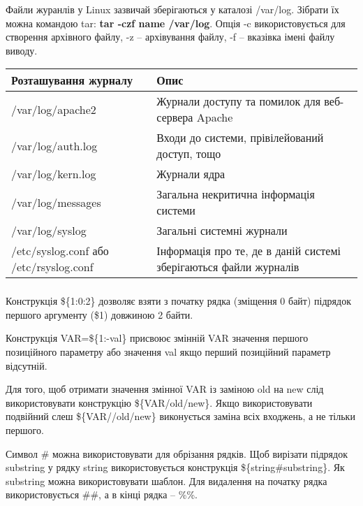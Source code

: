 \documentclass[t]{beamer}  %
\begin{document}
\begin{frame}
  \frametitle{\insertsection} 
	\framesubtitle{\insertsubsection}
Файли журанлів у Linux зазвичай зберігаються у каталозі /var/log. Зібрати їх можна командою tar:
\textbf{tar -czf name /var/log}.
Опція -c використовується для створення архівного файлу, -z -- архівування файлу, -f -- вказівка імені файлу виводу.
\begin{table}
  \label{tab:}

  \begin{center}
    \begin{tabular}{|p{100pt}|p{200pt}|}
    \hline
       {\bf Розташування журналу} & {\bf Опис} \\
       \hline
       /var/log/apache2 & Журнали доступу та помилок для веб-сервера Apache\\
       \hline
       /var/log/auth.log & Входи до системи, прівілейований доступ, тощо\\
       \hline
       /var/log/kern.log & Журнали ядра\\
       \hline
       /var/log/messages & Загальна некритична інформація системи\\
       \hline
       /var/log/syslog & Загальні системні журнали\\
       \hline
       /etc/syslog.conf або /etc/rsyslog.conf & Інформація про те, де в даній системі зберігаються файли журналів\\
       \hline
    \end{tabular}
  \end{center}
\end{table}
\end{frame}

\begin{frame}
  \frametitle{\insertsection} 
	\framesubtitle{\insertsubsection}
Конструкція \$\{1:0:2\} дозволяє взяти з початку рядка (зміщення 0 байт) підрядок першого аргументу (\$1) довжиною 2 байти.	

Конструкція VAR=\$\{1:-val\} присвоює змінній VAR значення першого позиційного параметру або значення val якщо перший позиційний параметр відсутній.

Для того, щоб отримати значення змінної VAR із заміною old на new слід використовувати конструкцію \$\{VAR/old/new\}. Якщо використовувати подвійний слеш \$\{VAR//old/new\} виконується заміна всіх входжень, а не тільки першого. 

Символ  \# можна використовувати для обрізання рядків. Щоб вирізати підрядок substring у рядку string використовується конструкція \$\{string\#substring\}. Як substring можна використовувати шаблон. Для видалення на початку рядка використовується \#\#, а в кінці рядка -- \%\%.
\end{frame}	
\end{document}
